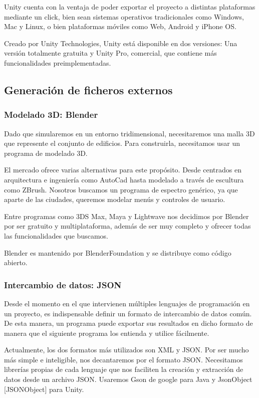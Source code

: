\documentclass[12pt,a4paper,openright,oneside]{article}
\numberwithin{equation}{section}
\theoremstyle{definition}
\begin{document}
Unity cuenta con la ventaja de poder exportar el proyecto a distintas plataformas mediante un click, bien sean sistemas operativos tradicionales como Windows, Mac y Linux, o bien plataformas móviles como Web, Android y iPhone OS. 

Creado por Unity Technologies, Unity está disponible en dos versiones: Una versión totalmente gratuita y Unity Pro, comercial, que contiene más funcionalidades preimplementadas.



\subsection{Generación de ficheros externos}

\subsubsection{Modelado 3D: Blender}

Dado que simularemos en un entorno tridimensional, necesitaremos una malla 3D que represente el conjunto de edificios. Para construirla, necesitamos usar un programa de modelado 3D. 

El mercado ofrece varias alternativas para este propósito. Desde centrados en arquitectura e ingeniería como AutoCad hasta modelado a través de escultura como ZBrush. Nosotros buscamos un programa de espectro genérico, ya que aparte de las ciudades, queremos modelar menús y controles de usuario. 

Entre programas como 3DS Max, Maya y Lightwave nos decidimos por Blender por ser gratuito y multiplataforma, además de ser muy completo y ofrecer todas las funcionalidades que buscamos.

Blender es mantenido por BlenderFoundation y se distribuye como código abierto.

\subsubsection{Intercambio de datos: JSON}

Desde el momento en el que intervienen múltiples lenguajes de programación en un proyecto, es indispensable definir un formato de intercambio de datos común. De esta manera, un programa puede exportar sus resultados en dicho formato de manera que el siguiente programa los entienda y utilice fácilmente.

Actualmente, los dos formatos más utilizados son XML y JSON. Por ser mucho más simple e inteligible, nos decantaremos por el formato JSON. Necesitamos librerías propias de cada lenguaje que nos faciliten la creación y extracción de datos desde un archivo JSON. Usaremos Gson de google para Java y JsonObject [JSONObject] para Unity.
\end{document}
